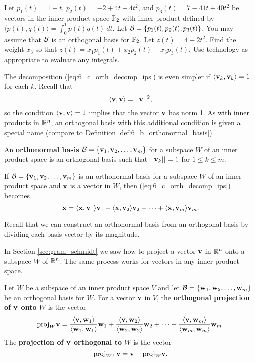 \begin{activity} Let $p_1(t) = 1-t$, $p_2(t) = -2+4t+4t^2$, and $p_3(t) = 7-41t+40t^2$ be vectors in the inner product space $\mathbb{P}_2$ with inner product defined by $\langle p(t), q(t) \rangle = \int_0^1 p(t)q(t) \ dt$. Let $\mathcal{B} = \{p_1(t), p_2(t), p_3(t)\}$. You may assume that $\mathcal{B}$ is an orthogonal basis for $\mathbb{P}_2$. Let $z(t) = 4-2t^2$. Find the weight $x_3$ so that $z(t) = x_1p_1(t) + x_2 p_2(t) + x_3 p_3(t)$. Use technology as appropriate to evaluate any integrals. 

\end{activity}


The decomposition (\ref{eq:6_c_orth_decomp_ips}) is even simpler if $\langle \mathbf{v}_k, \mathbf{v}_k \rangle = 1$ for each $k$. Recall that
\[\langle \mathbf{v}, \mathbf{v} \rangle = || \mathbf{v} ||^2,\]
so the condition $\langle \mathbf{v}, \mathbf{v} \rangle  = 1$ implies that the vector $\mathbf{v}$ has norm 1. As with inner products in $\mathbb{R}^n$, an orthogonal basis with this additional condition is given a special name (compare to Definition \ref{def:6_b_orthonormal_basis}).

\begin{definition} An \textbf{orthonormal basis} $\mathcal{B} = \{\mathbf{v}_1, \mathbf{v}_2, \ldots, \mathbf{v}_m\}$ for a subspace $W$ of an inner product space is an orthogonal basis such that $|| \mathbf{v}_k || = 1$ for $1\leq k\leq m$.
\end{definition}

If $\mathcal{B} = \{\mathbf{v}_1, \mathbf{v}_2, \ldots, \mathbf{v}_m\}$ is an orthonormal basis for a subspace $W$ of an inner product space and $\mathbf{x}$ is a vector in $W$, then  (\ref{eq:6_c_orth_decomp_ips}) becomes
\begin{equation}
\mathbf{x} = \langle \mathbf{x}, \mathbf{v}_1 \rangle \mathbf{v}_1 +  \langle \mathbf{x}, \mathbf{v}_2 \rangle \mathbf{v}_2 + \cdots + \langle \mathbf{x}, \mathbf{v}_m \rangle \mathbf{v}_m. \label{eq:6_c_orthnorm_decomp_ips}
\end{equation}

Recall that we can construct an orthonormal basis from an orthogonal basis by dividing each basis vector by its magnitude.


\label{sec:orthog_proj_subspace}

In Section \ref{sec:gram_schmidt} we saw how to project a vector $\mathbf{v}$ in $\mathbb{R}^n$ onto a subspace $W$ of $\mathbb{R}^n$. The same process works for vectors in any inner product space.

\begin{definition} Let $W$ be a subspace of an inner product space $V$ and let $\mathcal{B} = \{\mathbf{w}_1, \mathbf{w}_2, \ldots, \mathbf{w}_m\}$ be an orthogonal basis for $W$. For a vector $\mathbf{v}$ in $V$, the \textbf{orthogonal projection of $\mathbf{v}$ onto $W$} is the vector
\[\text{proj}_W \mathbf{v} =  \frac{\langle \mathbf{v}, \mathbf{w}_1 \rangle }{\langle \mathbf{w}_1, \mathbf{w}_1 \rangle } \mathbf{w}_1 + \frac{\langle \mathbf{v}, \mathbf{w}_2 \rangle }{\langle \mathbf{w}_2, \mathbf{w}_2 \rangle }  \mathbf{w}_2 + \cdots + \frac{\langle \mathbf{v}, \mathbf{w}_m \rangle}{\langle \mathbf{w}_m, \mathbf{w}_m \rangle} \mathbf{w}_m.\] 
The \textbf{projection of $\mathbf{v}$ orthogonal to $W$} is the vector
\[\text{proj}_{W^{\perp}} \mathbf{v} = \mathbf{v} - \text{proj}_W \mathbf{v}.\]
\end{definition}

